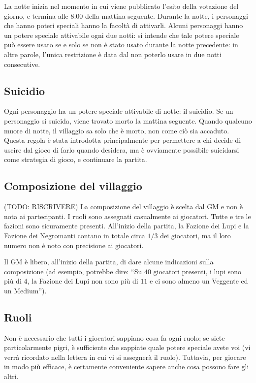 \documentclass[a4paper,10pt]{article}
\begin{document}
La notte inizia nel momento in cui viene pubblicato l'esito della votazione del giorno, e termina alle 8:00 della mattina seguente.
Durante la notte, i personaggi che hanno poteri speciali hanno la facoltà di attivarli.
Alcuni personaggi hanno un potere speciale attivabile ogni due notti: si intende che tale potere speciale può essere usato se e solo se non è stato usato durante la notte precedente: in altre parole, l'unica restrizione è data dal non poterlo usare in due notti consecutive.


\subsection{Suicidio}

Ogni personaggio ha un potere speciale attivabile di notte: il suicidio.
Se un personaggio si suicida, viene trovato morto la mattina seguente. Quando qualcuno muore di notte, il villaggio sa solo che è morto, non come ciò sia accaduto.
Questa regola è stata introdotta principalmente per permettere a chi decide di uscire dal gioco di farlo quando desidera, ma è ovviamente possibile suicidarsi come strategia di gioco, e continuare la partita.


\subsection{Composizione del villaggio}

(TODO: RISCRIVERE)
La composizione del villaggio è scelta dal GM e non è nota ai partecipanti. I ruoli sono assegnati casualmente ai giocatori.
Tutte e tre le fazioni sono sicuramente presenti. All'inizio della partita, la Fazione dei Lupi e la Fazione dei Negromanti contano in totale circa $1/3$ dei giocatori, ma il loro numero non è noto con precisione ai giocatori.

Il GM è libero, all'inizio della partita, di dare alcune indicazioni sulla composizione (ad esempio, potrebbe dire: ``Su $40$ giocatori presenti, i lupi sono più di $4$, la Fazione dei Lupi non sono più di $11$ e ci sono almeno un Veggente ed un Medium'').


\subsection{Ruoli}

Non è necessario che tutti i giocatori sappiano cosa fa ogni ruolo; se siete particolarmente pigri, è sufficiente che sappiate quale potere speciale avete voi (vi verrà ricordato nella lettera in cui vi si assegnerà il ruolo). Tuttavia, per giocare in modo più efficace, è certamente conveniente sapere anche cosa possono fare gli altri.
\end{document}
